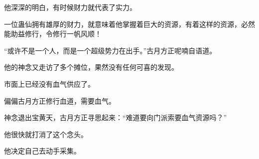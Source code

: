\begin{this_body}
他深深的明白，有时候财力就代表了实力。

一位蛊仙拥有雄厚的财力，就意味着他掌握着巨大的资源，有着这样的资源，必然能助益修行，令修行一帆风顺！

“或许不是一个人，而是一个超级势力在出手。”古月方正呢喃自语道。

他的神念又走访了多个摊位，果然没有任何可喜的发现。

市面上已经没有血气供应了。

偏偏古月方正修行血道，需要血气。

神念退出宝黄天，古月方正寻思起来：“难道要向门派索要血气资源吗？”

他很快就打消了这个念头。

他决定自己去动手采集。

\end{this_body}

